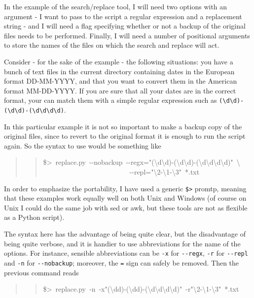 \documentclass[10pt,a4paper,english]{article}
\begin{document}
In the example of the search/replace tool, 
I will need two options with an argument - I want 
to pass to the script a regular expression and a replacement string - 
and I will need a flag specifying whether or not a backup of the original 
files needs to be performed. Finally, I will need a number of positional
arguments to store the names of the files on which the search and
replace will act.

Consider - for the sake of the example - the following situations:
you have a bunch of text files in the current directory containing dates 
in the European format DD-MM-YYYY, and that you want to convert them in
the American format MM-DD-YYYY. If you are sure that all your dates
are in the correct format, your can match them with a simple regular
expression such as \texttt{({\textbackslash}d{\textbackslash}d)-({\textbackslash}d{\textbackslash}d)-({\textbackslash}d{\textbackslash}d{\textbackslash}d{\textbackslash}d)}.

In this particular example it is not so important to make a backup
copy of the original files, since to revert to the original
format it is enough to run the script again. So the syntax to use 
would be something like
\begin{quote}
\begin{quote}{\ttfamily \raggedright \noindent
{\$}>~replace.py~-{}-nobackup~-{}-regx="({\textbackslash}d{\textbackslash}d)-({\textbackslash}d{\textbackslash}d)-({\textbackslash}d{\textbackslash}d{\textbackslash}d{\textbackslash}d)"~{\textbackslash}~\\
~~~~~~~~~~~~~~~~~~~~~~~~~-{}-repl="{\textbackslash}2-{\textbackslash}1-{\textbackslash}3"~*.txt
}\end{quote}
\end{quote}

In order to emphasize the portability, I have used a generic 
\texttt{{\$}>} promtp, meaning that these examples work equally well on
both Unix and Windows (of course on Unix I could do the same 
job with sed or awk, but these tools are not as flexible as
a Python script).

The syntax here has the advantage of being
quite clear, but the disadvantage of being quite verbose, and it is
handier to use abbreviations for the name of the options. For instance, 
sensible abbreviations can be \texttt{-x} for \texttt{-{}-regx}, \texttt{-r} for \texttt{-{}-repl} 
and \texttt{-n} for \texttt{-{}-nobackup}; moreover, the \texttt{=} sign can safely be
removed. Then the previous command reads
\begin{quote}
\begin{quote}{\ttfamily \raggedright \noindent
{\$}>~replace.py~-n~-x"({\textbackslash}dd)-({\textbackslash}dd)-({\textbackslash}d{\textbackslash}d{\textbackslash}d{\textbackslash}d)"~-r"{\textbackslash}2-{\textbackslash}1-{\textbackslash}3"~*.txt
}\end{quote}
\end{quote}
\end{document}
